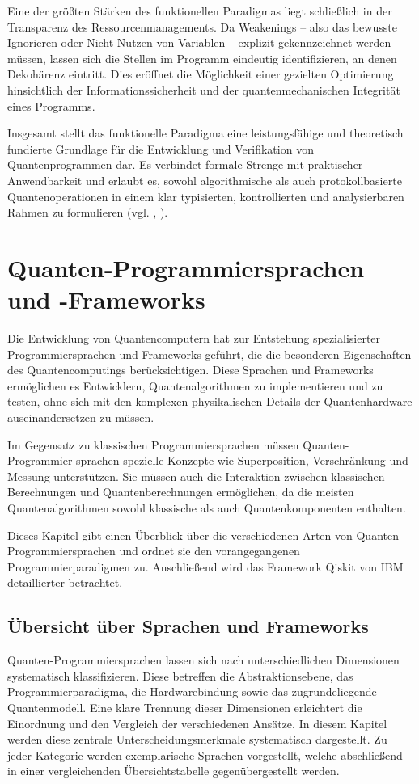 Eine der größten Stärken des funktionellen Paradigmas liegt schließlich in der Transparenz des Ressourcenmanagements. Da Weakenings -- also das bewusste Ignorieren oder Nicht-Nutzen von Variablen -- explizit gekennzeichnet werden müssen, lassen sich die Stellen im Programm eindeutig identifizieren, an denen Dekohärenz eintritt. Dies eröffnet die Möglichkeit einer gezielten Optimierung hinsichtlich der Informationssicherheit und der quantenmechanischen Integrität eines Programms.

Insgesamt stellt das funktionelle Paradigma eine leistungsfähige und theoretisch fundierte Grundlage für die Entwicklung und Verifikation von Quantenprogrammen dar. Es verbindet formale Strenge mit praktischer Anwendbarkeit und erlaubt es, sowohl algorithmische als auch protokollbasierte Quantenoperationen in einem klar typisierten, kontrollierten und analysierbaren Rahmen zu formulieren (vgl. \citeauthor{thorsten_altenkirch_functional_2005}, \citeyear{thorsten_altenkirch_functional_2005}).


\section{Quanten-Programmiersprachen und -Frameworks}
\label{sec:programming-languages}

Die Entwicklung von Quantencomputern hat zur Entstehung spezialisierter Programmiersprachen und Frameworks geführt, die die besonderen Eigenschaften des Quantencomputings berücksichtigen. Diese Sprachen und Frameworks ermöglichen es Entwicklern, Quantenalgorithmen zu implementieren und zu testen, ohne sich mit den komplexen physikalischen Details der Quantenhardware auseinandersetzen zu müssen.

Im Gegensatz zu klassischen Programmiersprachen müssen Quanten-Programmier-sprachen spezielle Konzepte wie Superposition, Verschränkung und Messung unterstützen. Sie müssen auch die Interaktion zwischen klassischen Berechnungen und Quantenberechnungen ermöglichen, da die meisten Quantenalgorithmen sowohl klassische als auch Quantenkomponenten enthalten.

Dieses Kapitel gibt einen Überblick über die verschiedenen Arten von Quanten-Programmiersprachen und ordnet sie den vorangegangenen Programmierparadigmen zu. Anschließend wird das Framework Qiskit von IBM detaillierter betrachtet.

\subsection{Übersicht über Sprachen und Frameworks}
Quanten-Programmiersprachen lassen sich nach unterschiedlichen Dimensionen systematisch klassifizieren. Diese betreffen die Abstraktionsebene, das Programmierparadigma, die Hardwarebindung sowie das zugrundeliegende Quantenmodell. Eine klare Trennung dieser Dimensionen erleichtert die Einordnung und den Vergleich der verschiedenen Ansätze. In diesem Kapitel werden diese zentrale Unterscheidungsmerkmale systematisch dargestellt. Zu jeder Kategorie werden exemplarische Sprachen vorgestellt, welche abschließend in einer vergleichenden Übersichtstabelle gegenübergestellt werden.

